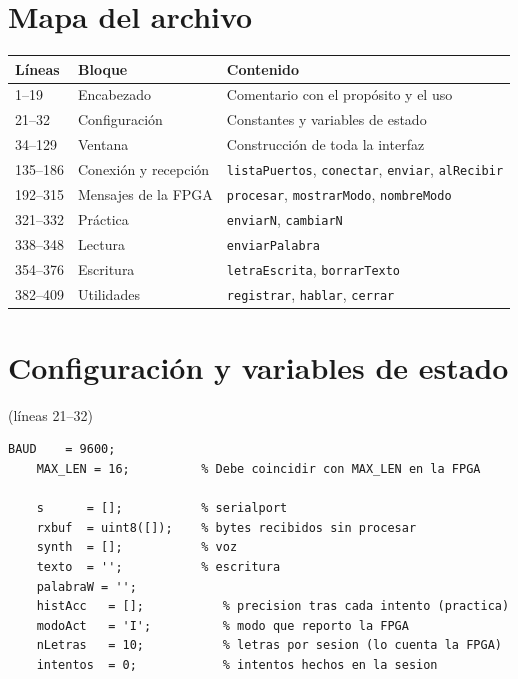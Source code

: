 \documentclass[11pt,a4paper]{article}
\newcommand{\linea}[1]{\textcolor{gris}{\small(líneas #1)}}
\newcommand{\cod}[1]{\texttt{#1}}
\begin{document}
\section{Mapa del archivo}

\begin{center}
\begin{tabular}{>{\raggedright}p{3.2cm} >{\raggedright}p{4.6cm} >{\raggedright\arraybackslash}p{6.2cm}}
\toprule
\textbf{Líneas} & \textbf{Bloque} & \textbf{Contenido} \\
\midrule
1--19 & Encabezado & Comentario con el propósito y el uso \\
21--32 & Configuración & Constantes y variables de estado \\
34--129 & Ventana & Construcción de toda la interfaz \\
135--186 & Conexión y recepción & \cod{listaPuertos}, \cod{conectar}, \cod{enviar}, \cod{alRecibir} \\
192--315 & Mensajes de la FPGA & \cod{procesar}, \cod{mostrarModo}, \cod{nombreModo} \\
321--332 & Práctica & \cod{enviarN}, \cod{cambiarN} \\
338--348 & Lectura & \cod{enviarPalabra} \\
354--376 & Escritura & \cod{letraEscrita}, \cod{borrarTexto} \\
382--409 & Utilidades & \cod{registrar}, \cod{hablar}, \cod{cerrar} \\
\bottomrule
\end{tabular}
\end{center}

\section{Configuración y variables de estado}
\linea{21--32}

\begin{lstlisting}[firstnumber=21]
    BAUD    = 9600;
    MAX_LEN = 16;          % Debe coincidir con MAX_LEN en la FPGA

    s      = [];           % serialport
    rxbuf  = uint8([]);    % bytes recibidos sin procesar
    synth  = [];           % voz
    texto  = '';           % escritura
    palabraW = '';
    histAcc   = [];           % precision tras cada intento (practica)
    modoAct   = 'I';          % modo que reporto la FPGA
    nLetras   = 10;           % letras por sesion (lo cuenta la FPGA)
    intentos  = 0;            % intentos hechos en la sesion
\end{lstlisting}
\end{document}
